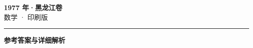 \documentclass[zihao=5, a4paper]{ctexart}
\begin{document}
\begin{center}
  {\Large\bfseries 1977 年·黑龙江卷}\\[4pt]
  {\large 数学 · 印刷版}
\end{center}
\medskip
{}

\par\bigskip\hrule\bigskip
{}
\begin{center}{\large\bfseries 参考答案与详细解析}\end{center}
\smallskip

\end{document}
